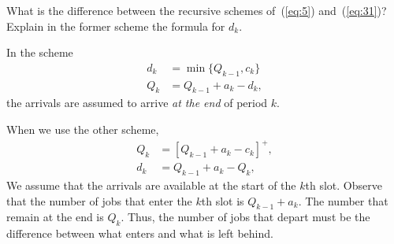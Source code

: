 

\begin{question}
  What is the difference between the recursive schemes of~(\ref{eq:5}) and~(\ref{eq:31})? Explain in the former scheme
  the formula for $d_k$.  
  \begin{hint}
  \end{hint}
\begin{solution}
  In the scheme
  \begin{equation*}
    \begin{split}
      d_k &= \min\{Q_{k-1}, c_k\}\\
Q_k &= Q_{k-1} + a_k - d_k,
    \end{split}
  \end{equation*}
the arrivals are assumed to arrive \emph{at the end} of period $k$. 

When we use the other scheme,
  \begin{equation*}
    \begin{split}
      Q_k &= [Q_{k-1} + a_k - c_k]^+,\\
      d_k &= Q_{k-1} + a_k - Q_k,
    \end{split}
  \end{equation*}
  We assume that the arrivals are available at the start of the $k$th
  slot. Observe that the number of jobs that enter the $k$th slot is
  $Q_{k-1}+a_k$. The number that remain at the end is $Q_k$. Thus, the
  number of jobs that depart must be the difference between what
  enters and what is left behind.
\end{solution}
\end{question}


